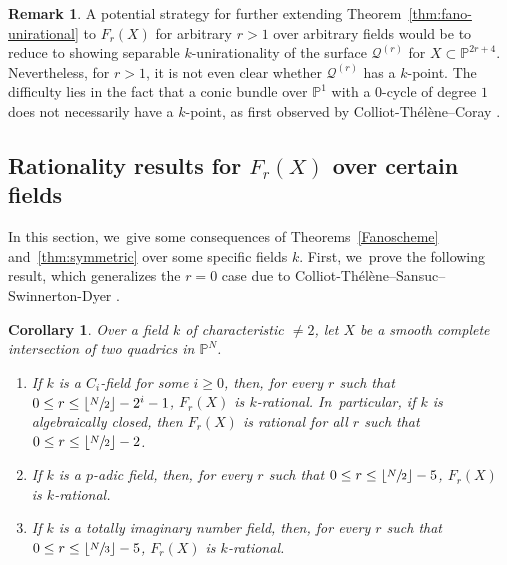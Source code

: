 \documentclass[JEP,XML,SOM,Unicode,NoEqCountersInSection,published]{cedram}
\theoremstyle{plain}
\newtheorem{cor}[thm]{Corollary}
\theoremstyle{definition}
\newtheorem{rem}[thm]{Remark}
\renewcommand\P{\mathbb{P}}
\begin{document}
\begin{rem}
A potential strategy for further extending Theorem~\ref{thm:fano-unirational} to $F_r(X)$ for arbitrary $r>1$ over arbitrary fields would be to reduce to showing separable $k$\nobreakdash-unirationality of the surface $\mathcal{Q}^{(r)}$ for $X\subset \P^{2r+4}$.
Nevertheless, for $r>1$, it is not even clear whether $\mathcal{Q}^{(r)}$ has a $k$\nobreakdash-point.
The difficulty lies in the fact that a conic bundle over $\P^1$ with a $0$-cycle of degree $1$ does not necessarily have a $k$\nobreakdash-point,
as first observed by Colliot-Thélène--Coray \cite{CTC79}.
\end{rem}

\subsection{Rationality results for \(F_r(X)\) over certain fields}\label{section-specific-fields}
In this section, we~give some consequences of Theorems~\ref{Fanoscheme} and~\ref{thm:symmetric} over some specific fields \(k\).
First, we~prove the following result, which generalizes the $r=0$ case due to Colliot-Thélène--Sansuc--Swinnerton-Dyer \cite[Th.\,3.4]{CTSSD}.

\begin{cor}\label{cor:fano-scheme-rational}
Over a field \(k\) of characteristic \(\neq 2\),
let $X$ be a smooth complete intersection of two quadrics in $\P^N$.
\begin{enumerate}
\item\label{item:Ci} If $k$ is a $C_i$-field for some $i\geq 0$, then, for every $r$ such that $0\leq r\leq \lfloor\sfrac{N}{2}\rfloor -2^i-1$, $F_r(X)$ is $k$\nobreakdash-rational. In~particular, if \(k\) is algebraically closed, then \(F_r(X)\) is rational for all $r$ such that $0\leq r\leq \lfloor\sfrac{N}{2}\rfloor -2$.
\item\label{item:p-adic} If $k$ is a $p$-adic field, then, for every $r$ such that $0\leq r\leq \lfloor\sfrac{N}{2}\rfloor -5$, $F_r(X)$ is $k$\nobreakdash-rational.
\item\label{item:totally-imaginary} If $k$ is a totally imaginary number field, then, for every $r$ such that $0\leq r\leq \lfloor\sfrac{N}{3}\rfloor -5$, $F_r(X)$ is $k$\nobreakdash-rational.
\end{enumerate}
\end{cor}
\end{document}

